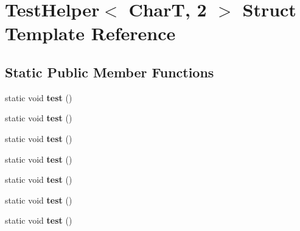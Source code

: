 \hypertarget{struct_test_helper_3_01_char_t_00_012_01_4}{}\section{Test\+Helper$<$ CharT, 2 $>$ Struct Template Reference}
\label{struct_test_helper_3_01_char_t_00_012_01_4}
\subsection*{Static Public Member Functions}
\begin{DoxyCompactItemize}
\item 
\mbox{\label{struct_test_helper_3_01_char_t_00_012_01_4_a0dec75ee46d447b0a5df8fd319c5a306}} 
static void {\bfseries test} ()
\item 
\mbox{\label{struct_test_helper_3_01_char_t_00_012_01_4_aef5acdd36886cdd893c49067839ab9a9}} 
static void {\bfseries test} ()
\item 
\mbox{\label{struct_test_helper_3_01_char_t_00_012_01_4_aef5acdd36886cdd893c49067839ab9a9}} 
static void {\bfseries test} ()
\item 
\mbox{\label{struct_test_helper_3_01_char_t_00_012_01_4_aef5acdd36886cdd893c49067839ab9a9}} 
static void {\bfseries test} ()
\item 
\mbox{\label{struct_test_helper_3_01_char_t_00_012_01_4_aef5acdd36886cdd893c49067839ab9a9}} 
static void {\bfseries test} ()
\item 
\mbox{\label{struct_test_helper_3_01_char_t_00_012_01_4_aef5acdd36886cdd893c49067839ab9a9}} 
static void {\bfseries test} ()
\item 
\mbox{\label{struct_test_helper_3_01_char_t_00_012_01_4_aef5acdd36886cdd893c49067839ab9a9}} 
static void {\bfseries test} ()
\end{DoxyCompactItemize}


